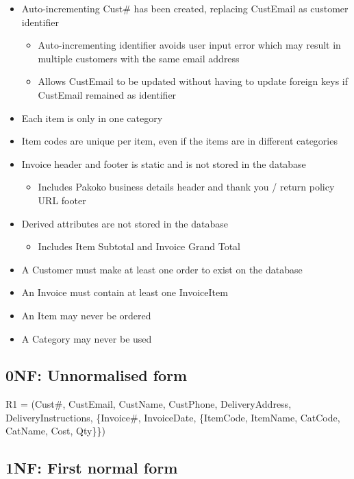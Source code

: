 \begin{itemize}
\item Auto-incrementing Cust\# has been created, replacing CustEmail as customer identifier
	\begin{itemize}
	\item Auto-incrementing identifier avoids user input error which may result in multiple customers with the same email address
	\item Allows CustEmail to be updated without having to update foreign keys if CustEmail remained as identifier
	\end{itemize}
\item Each item is only in one category
\item Item codes are unique per item, even if the items are in different categories
\item Invoice header and footer is static and is not stored in the database
	\begin{itemize}
	\item Includes Pakoko business details header and thank you / return policy URL footer
	\end{itemize}
\item Derived attributes are not stored in the database
	\begin{itemize}
	\item Includes Item Subtotal and Invoice Grand Total
	\end{itemize}
\item A Customer must make at least one order to exist on the database
\item An Invoice must contain at least one InvoiceItem
\item An Item may never be ordered
\item A Category may never be used
\end{itemize}

\subsection{0NF: Unnormalised form}

R1 = (Cust\#, CustEmail, CustName, CustPhone, DeliveryAddress, DeliveryInstructions, \{Invoice\#, InvoiceDate, \{ItemCode, ItemName, CatCode, CatName, Cost, Qty\}\})

\subsection{1NF: First normal form}

